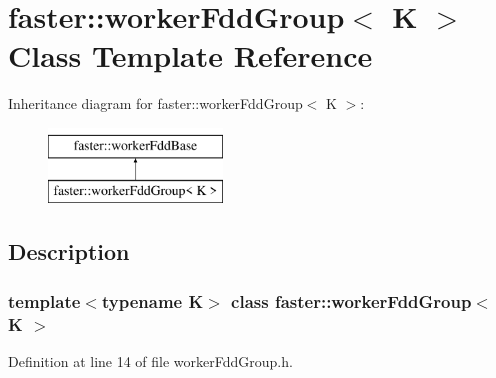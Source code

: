 \hypertarget{classfaster_1_1workerFddGroup}{}\section{faster\+:\+:worker\+Fdd\+Group$<$ K $>$ Class Template Reference}
\label{classfaster_1_1workerFddGroup}
Inheritance diagram for faster\+:\+:worker\+Fdd\+Group$<$ K $>$\+:\begin{figure}[H]
\begin{center}
\leavevmode
\includegraphics[height=2.000000cm]{classfaster_1_1workerFddGroup}
\end{center}
\end{figure}


\subsection{Description}
\subsubsection*{template$<$typename K$>$\newline
class faster\+::worker\+Fdd\+Group$<$ K $>$}



Definition at line 14 of file worker\+Fdd\+Group.\+h.

